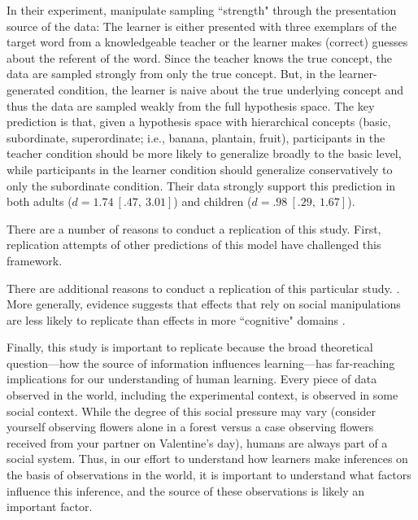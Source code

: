 \documentclass[man]{apa2}
\begin{document}
In their experiment,  manipulate  sampling  ``strength"  through  the presentation source of the data: The learner is either presented with three exemplars of the target word from a knowledgeable teacher or the learner makes (correct) guesses about the referent of the word. Since the teacher  knows the true concept, the data are sampled strongly from only the true concept. But, in the learner-generated condition, the learner is naive about the true underlying concept and thus the data are sampled weakly from the full hypothesis space.  The key prediction is that, given a hypothesis space with hierarchical concepts (basic, subordinate, superordinate; i.e.,  banana, plantain, fruit),  participants in the teacher condition should be more likely to generalize broadly to the basic level, while participants in the learner condition should generalize conservatively to only the subordinate condition. Their data strongly support this prediction in both adults ($d = 1.74\ [.47,\ 3.01]$) and children  ($d = .98\ [.29,\ 1.67]$).


There are a number of reasons to conduct a replication of this study. First, replication attempts of other predictions of this model have challenged this framework.
\cite{spencer2011}
\cite{jenkins2015non}


There are additional reasons to conduct a replication of this particular study. \cite{navarro2012sampling}. More generally, evidence suggests that effects that rely on social manipulations are less likely to replicate than effects in more ``cognitive" domains \cite{reproProj2015}.

Finally, this study is important to replicate because the broad theoretical question---how the source of information influences learning---has far-reaching implications for our understanding of human learning. Every piece of data observed in the world, including the experimental context,  is observed in some social context. While the degree of this social pressure may vary (consider yourself observing flowers  alone in a forest versus a case observing flowers received from your partner on Valentine's day), humans are always part of a social system. Thus, in our effort to understand how learners make inferences on the basis of observations in the world, it is important to understand what factors influence this inference, and the source of these observations is likely an important factor.
\end{document}
